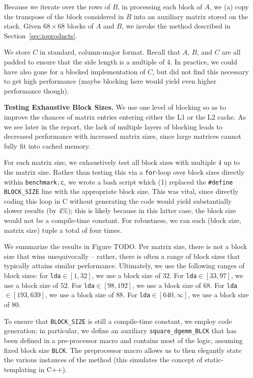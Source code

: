 \documentclass{article} %
\begin{document}
Because we iterate over the rows of $B$, in processing
each block of $A$, we (a) copy the transpose of the block considered in $B$ into
an auxiliary matrix stored on the stack. Given $68\times 68$ blocks of $A$ and
$B$, we invoke the method described in Section~\ref{sec:ioproducts}.

We store $C$ in standard, column-major format. Recall that $A$, $B$, and $C$
are all padded to ensure that the side length is a multiple of $4$. In practice,
we could have also gone for a blocked implementation of $C$, but did not find
this necessary to get high performance (maybe blocking here would yield even
higher performance though).

\textbf{Testing Exhaustive Block Sizes.} We use one level
of blocking so as to improve the chances of matrix entries entering either the
L1 or the L2 cache. As we see later in the report, the lack of multiple layers
of blocking leads to decreased performance with increased matrix sizes, since
large matrices cannot fully fit into cached memory.

For each matrix size, we exhaustively test all block sizes with multiple $4$ up
to the matrix size. Rather than testing this via a \texttt{for}-loop over block sizes
directly within \texttt{benchmark.c}, we wrote a bash script which (1) replaced the
\texttt{\#define BLOCK\_SIZE} line with the appropriate block size. This was vital,
since directly coding this loop in C without generating the code would yield
substantially slower results (by 4\%); this is likely because in this latter case,
the block size would not be a compile-time constant. For robustness, we ran each
(block size, matrix size) tuple a total of four times.

We summarize the results in Figure TODO. Per matrix size, there is not a block size
that wins unequivocally -- rather, there is often a range of block sizes that typically
attains similar performance. Ultimately, we use the following ranges of block sizes:
for \texttt{lda}$\in [1, 32]$, we use a block size of $32$. For \texttt{lda}$\in [33, 97]$,
we use a block size of $52$. For \texttt{lda}$\in [98, 192]$, we use a block size of $68$.
For \texttt{lda}$\in [193, 639]$, we use a block size of $88$. For \texttt{lda}$\in [640, \infty]$,
we use a block size of $80$.

To ensure that \texttt{BLOCK\_SIZE} is still a compile-time constant, we employ
code generation; in particular, we define an auxiliary \texttt{square\_dgemm\_BLCK} that
has been defined in a pre-processor macro and contains most of the logic, assuming fixed block
size \texttt{BLCK}. The preprocessor macro allows us to then elegantly state the various
instances of the method (this simulates the concept of static-templating in C++).
\end{document}
